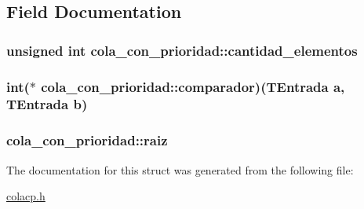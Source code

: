 \subsection{Field Documentation}
\hypertarget{structcola__con__prioridad_acd8b855e03140913076aacb735478691}{
\subsubsection[{cantidad\+\_\+elementos}]{\setlength{\rightskip}{0pt plus 5cm}unsigned int cola\+\_\+con\+\_\+prioridad\+::cantidad\+\_\+elementos}}\label{structcola__con__prioridad_acd8b855e03140913076aacb735478691}
\hypertarget{structcola__con__prioridad_a495cd3ba00929a2e0efb52c2807a86a1}{
\subsubsection[{comparador}]{\setlength{\rightskip}{0pt plus 5cm}int($\ast$ cola\+\_\+con\+\_\+prioridad\+::comparador)({\bf T\+Entrada} a, {\bf T\+Entrada} b)}}\label{structcola__con__prioridad_a495cd3ba00929a2e0efb52c2807a86a1}
\hypertarget{structcola__con__prioridad_a0d06fd877a9e6da6cd8bad02a32e5f46}{
\subsubsection[{raiz}]{ cola\+\_\+con\+\_\+prioridad\+::raiz}}\label{structcola__con__prioridad_a0d06fd877a9e6da6cd8bad02a32e5f46}


The documentation for this struct was generated from the following file\+:\begin{DoxyCompactItemize}
\item 
\hyperlink{colacp_8h}{colacp.\+h}\end{DoxyCompactItemize}
